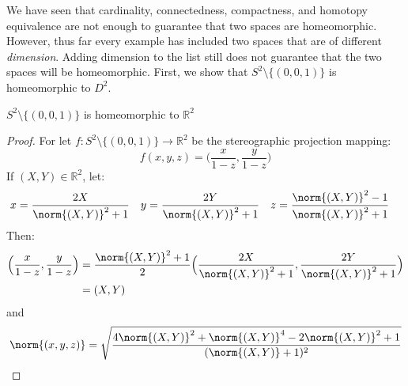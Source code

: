             We have seen that cardinality, connectedness, compactness, and
            homotopy equivalence are not enough to guarantee that two spaces are
            homeomorphic. However, thus far every example has included two
            spaces that are of different \textit{dimension}. Adding dimension to
            the list still does not guarantee that the two spaces will be
            homeomorphic. First, we show that $S^{2}\setminus\{(0,0,1)\}$ is
            homeomorphic to $D^{2}$.
            \begin{theorem}
                \label{thm:sphere_without_point_homeomorphic_to_plane}%
                $S^{2}\setminus\{(0,0,1)\}$ is homeomorphic to $\mathbb{R}^{2}$
            \end{theorem}
            \begin{proof}
                For let $f:S^{2}\setminus\{(0,0,1)\}\rightarrow \mathbb{R}^{2}$
                be the stereographic projection mapping:
                \begin{equation}
                    f(x,y,z)=\Big(\frac{x}{1-z},\frac{y}{1-z}\Big)
                \end{equation}
                If $(X,Y)\in\mathbb{R}^{2}$, let:
                \begin{align*}
                    x&=\frac{2X}{\norm{(X,Y)}^{2}+1}&
                    y&=\frac{2Y}{\norm{(X,Y)}^{2}+1}&
                    z&=\frac{\norm{(X,Y)}^{2}-1}{\norm{(X,Y)}^{2}+1} 
                \end{align*}
                Then:
                \begin{subequations}
                    \begin{align}
                        \Big(\frac{x}{1-z},\frac{y}{1-z}\Big)
                        &=\frac{\norm{(X,Y)}^{2}+1}{2}
                        \Big(\frac{2X}{\norm{(X,Y)}^{2}+ 1},
                             \frac{2Y}{\norm{(X,Y)}^{2}+1}\Big)\\
                        &=(X,Y)
                    \end{align}
                \end{subequations}
                and
                \begin{subequations}
                    \begin{align}
                        \norm{(x,y,z)}&=\sqrt{%
                            \frac{4\norm{(X,Y)}^{2}+\norm{(X,Y)}^{4}-
                                  2\norm{(X,Y)}^{2}+1}{(\norm{(X,Y)}+1)^{2}}%
                        }\\

\end{align}
\end{subequations}
\end{proof}
